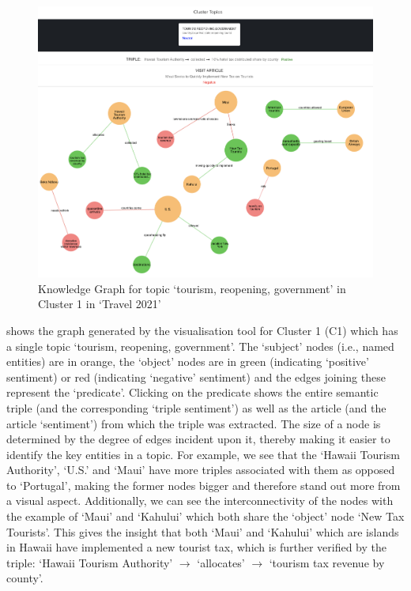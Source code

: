 \begin{figure}[H]
  \centering
  \includegraphics[width=\linewidth]{images/travel2021_triples_witha.png}
  \caption{Knowledge Graph for topic `tourism, reopening, government' in Cluster 1 in `Travel 2021'}
  \vspace{-1ex}
  \label{fig:triples_travel2021}
\end{figure}


 shows the graph generated by the visualisation tool for Cluster 1 (C1) which has a single topic `tourism, reopening, government'. The `subject' nodes (i.e., named entities) are in orange, the `object' nodes are in green (indicating `positive' sentiment) or red (indicating `negative' sentiment) and the edges joining these represent the `predicate'. Clicking on the predicate shows the entire semantic triple (and the corresponding `triple sentiment') as well as the article (and the article `sentiment') from which the triple was extracted. The size of a node is determined by the degree of edges incident upon it, thereby making it easier to identify the key entities in a topic. For example, we see that the `Hawaii Tourism Authority', `U.S.' and `Maui' have more triples associated with them as opposed to `Portugal', making the former nodes bigger and therefore stand out more from a visual aspect. Additionally, we can see the interconnectivity of the nodes with the example of `Maui' and `Kahului' which both share the `object' node `New Tax Tourists'. This gives the insight that both `Maui' and `Kahului' which are islands in Hawaii have implemented a new tourist tax, which is further verified by the triple: `Hawaii Tourism Authority' $\rightarrow$ `allocates'  $\rightarrow$ `tourism tax revenue by county'.

